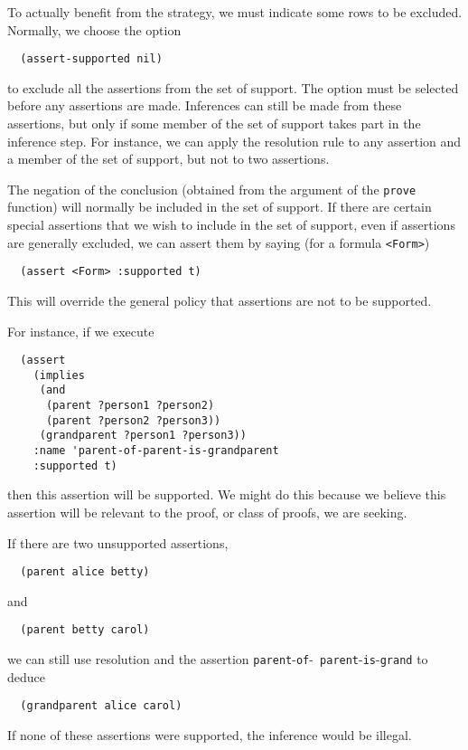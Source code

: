 To actually benefit from the strategy, we must indicate some rows to
be excluded.  Normally, we choose the
option
\begin{verbatim}
  (assert-supported nil)
\end{verbatim}
to exclude all the assertions from the set of support.  The option
must be selected before any assertions are made.   Inferences can
still be made from these assertions, but only if some member of the set
of support takes part in the inference step.  For instance, we can
apply the resolution rule to any assertion and a member of the set of
support, but not to two assertions.

The negation of the conclusion (obtained from the argument of the {\tt prove}
function) will normally be included in the set of support.  If there are
certain special assertions that we wish to include in the set of support,
even if assertions are generally excluded,
we can assert them by saying (for a formula \verb'<Form>')
\begin{verbatim}
  (assert <Form> :supported t)
\end{verbatim}
This will override the general policy that assertions are not to be
supported.

For instance, if we execute
\begin{verbatim}
  (assert
    (implies
     (and
      (parent ?person1 ?person2)
      (parent ?person2 ?person3))
     (grandparent ?person1 ?person3))
    :name 'parent-of-parent-is-grandparent
    :supported t)
\end{verbatim}
then this assertion will be supported.  We might do this because we believe
this assertion will be relevant to the proof, or class of proofs, we are
seeking.

If there are two unsupported
assertions,
\begin{verbatim}
  (parent alice betty)
\end{verbatim}
and
\begin{verbatim}
  (parent betty carol)
\end{verbatim}
we can still use resolution and the assertion {\tt parent}-{\tt of}-{\tt
parent}-{\tt is}-{\tt grand} to deduce
\begin{verbatim}
  (grandparent alice carol)
\end{verbatim}
If none of these assertions were supported, the inference would be illegal.

